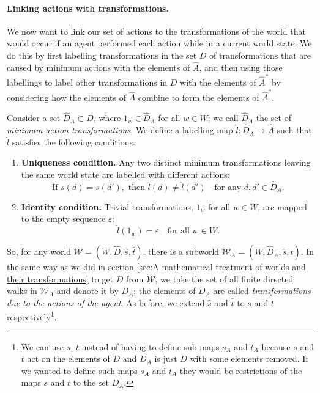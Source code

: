 \paragraph{Linking actions with transformations.}
We now want to link our set of actions to the transformations of the world that would occur if an agent performed each action while in a current world state.
We do this by first labelling transformations in the set $D$ of transformations that are caused by minimum actions with the elements of $\hat{A}$, and then using those labellings to label other transformations in $D$ with the elements of $\hat{A}^{\ast}$ by considering how the elements of $\hat{A}$ combine to form the elements of $\hat{A}^{\ast}$.

Consider a set $\hat{D}_{A} \subset D$, where $1_{w} \in \hat{D}_{A}$ for all $w \in W$; we call $\hat{D}_{A}$ the set of \textit{minimum action transformations}.
We define a labelling map $\hat{l}: \hat{D}_{A} \to \hat{A}$ such that $\hat{l}$ satisfies the following conditions:
\begin{enumerate}
	\item \textbf{Uniqueness condition.}
	      Any two distinct minimum transformations leaving the same world state are labelled with different actions:
	      \begin{equation}
		      \text{If } s(d) = s(d'), \text{ then } \hat{l}(d) \neq \hat{l}(d') \quad \text{for any } d, d' \in \hat{D}_{A}.
	      \end{equation}

	\item \textbf{Identity condition.}
	      Trivial transformations, $1_{w}$ for all $w \in W$, are mapped to the empty sequence $\varepsilon$:
	      \begin{equation}
		      \hat{l}(1_{w}) = \varepsilon \quad \text{for all } w \in W.
	      \end{equation}
\end{enumerate}

So, for any world $\mathscr{W} = (W, \hat{D}, \hat{s}, \hat{t})$, there is a subworld $\mathscr{W}_{A} = (W, \hat{D}_{A}, \hat{s}, \hat{t})$.
In the same way as we did in section \ref{sec:A mathematical treatment of worlds and their transformations} to get $D$ from $\mathscr{W}$, we take the set of all finite directed walks in $\mathscr{W}_{A}$ and denote it by $D_{A}$; the elements of $D_{A}$ are called \emph{transformations due to the actions of the agent}.
As before, we extend $\hat{s}$ and $\hat{t}$ to $s$ and $t$ respectively\footnote{
	We can use $s$, $t$ instead of having to define sub maps $s_{A}$ and $t_{A}$ because $s$ and $t$ act on the elements of $D$ and $D_{A}$ is just $D$ with some elements removed.
	If we wanted to define such maps $s_{A}$ and $t_{A}$ they would be restrictions of the maps $s$ and $t$ to the set $D_{A}$.
}.

